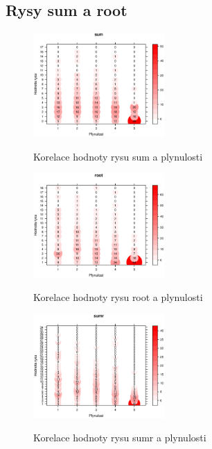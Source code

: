 \documentclass[12pt,a4paper]{report}
\begin{document}
\subsection{Rysy sum a root}
\begin{figure}[!htb]
\begin{center}
  \centering\includegraphics[width=50mm]{./grafy/rysy/sum-c.eps}
  \caption{Korelace hodnoty rysu sum a plynulosti}\label{gr:sumc}
\endminipage\quad
{}
  \centering\includegraphics[width=50mm]{./grafy/rysy/root-c.eps}
  \caption{Korelace hodnoty rysu root a plynulosti}\label{gr:rootc}
\endminipage\quad
{}
  \centering\includegraphics[width=50mm]{./grafy/rysy/sumr-c.eps}
  \caption{Korelace hodnoty rysu sumr a plynulosti}\label{gr:sumrc}
\endminipage
\end{center}
\end{figure}
\end{document}
